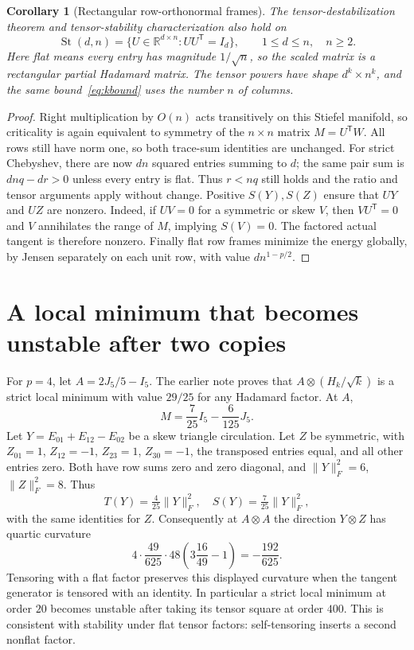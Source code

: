 \documentclass[11pt]{article}
\newtheorem{corollary}[theorem]{Corollary}
\newcommand{\R}{\mathbb R}
\begin{document}
\begin{corollary}[Rectangular row-orthonormal frames]
The tensor-destabilization theorem and tensor-stability characterization
also hold on
\[
 \operatorname{St}(d,n)=\{U\in\R^{d\times n}:UU^{\mathsf T}=I_d\},
 \qquad 1\le d\le n,\quad n\ge2.
\]
Here flat means every entry has magnitude $1/\sqrt n$, so the scaled
matrix is a rectangular partial Hadamard matrix. The tensor powers have
shape $d^k\times n^k$, and the same bound~\eqref{eq:kbound} uses the
number $n$ of columns.
\end{corollary}
\begin{proof}
Right multiplication by $O(n)$ acts transitively on this Stiefel
manifold, so criticality is again equivalent to symmetry of the
$n\times n$ matrix $M=U^{\mathsf T}W$. All rows still have norm one,
so both trace-sum identities are unchanged. For strict Chebyshev, there
are now $dn$ squared entries summing to $d$; the same pair sum is
$dnq-dr>0$ unless every entry is flat. Thus $r<nq$ still holds and
the ratio and tensor arguments apply without change. Positive
$S(Y),S(Z)$ ensure that $UY$ and $UZ$ are nonzero. Indeed, if
$UV=0$ for a symmetric or skew $V$, then $VU^{\mathsf T}=0$ and
$V$ annihilates the range of $M$, implying $S(V)=0$.
The factored actual tangent is therefore nonzero. Finally flat row frames minimize the energy
globally, by Jensen separately on each unit row, with value
$d n^{1-p/2}$.
\end{proof}

\section{A local minimum that becomes unstable after two copies}
For $p=4$, let $A=2J_5/5-I_5$. The earlier note proves that
$A\otimes(H_k/\sqrt k)$ is a strict local minimum with value $29/25$
for any Hadamard factor. At $A$,
\[
 M=\frac7{25}I_5-\frac6{125}J_5.
\]
Let $Y=E_{01}+E_{12}-E_{02}$ be a skew triangle circulation. Let $Z$
be symmetric, with $Z_{01}=1$, $Z_{12}=-1$, $Z_{23}=1$,
$Z_{30}=-1$, the transposed entries equal, and all other entries zero.
Both have row sums zero and zero diagonal, and
$\|Y\|_F^2=6$, $\|Z\|_F^2=8$. Thus
\[
 T(Y)=\tfrac4{25}\|Y\|_F^2,\quad
 S(Y)=\tfrac7{25}\|Y\|_F^2,
\]
with the same identities for $Z$. Consequently at $A\otimes A$ the
direction $Y\otimes Z$ has quartic curvature
\[
 4\cdot\frac{49}{625}\cdot48
 \left(3\frac{16}{49}-1\right)=-\frac{192}{625}.
\]
Tensoring with a flat factor preserves this displayed curvature when
the tangent generator is tensored with an identity. In particular a
strict local minimum at order $20$ becomes unstable after taking its
tensor square at order $400$. This is consistent with stability under
flat tensor factors: self-tensoring inserts a second nonflat factor.
\end{document}
